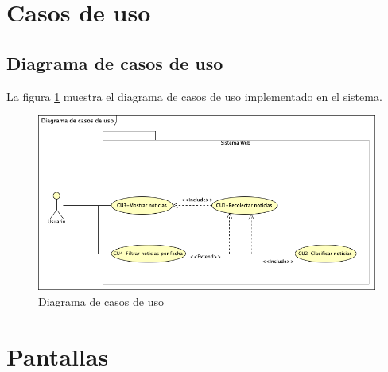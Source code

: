 \newpage
\section{Casos de uso}


\subsection{Diagrama de casos de uso}
La figura \ref{fig:DCU} muestra el diagrama de casos de uso implementado en el sistema.

\begin{figure}
  \centering
  \includegraphics[scale=.5]{imagenes/Diagramas/CasosDeuso}
  \caption{Diagrama de casos de uso}
  \label{fig:DCU}
\end{figure}



\newpage

\newpage

\newpage

\newpage

\section{Pantallas}


\newpage

\newpage

\newpage

\newpage




